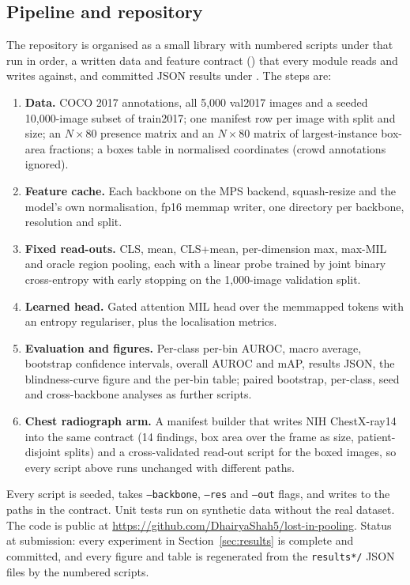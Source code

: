 \documentclass[10pt,letterpaper,twocolumn]{article}
\newcommand{\fname}[1]{\texttt{\detokenize{#1}}}
\begin{document}
\subsection{Pipeline and repository}
The repository is organised as a small library \fname{src/lip/} with numbered scripts under \fname{scripts/} that run in order, a
written data and feature contract (\fname{docs/CONTRACTS.md}) that every module reads and
writes against, and committed JSON results under \fname{results/}. The steps are:
\begin{enumerate}
\item \textbf{Data.} COCO 2017 annotations, all 5,000 val2017 images and a seeded
  10,000-image subset of train2017; one manifest row per image with split and size; an
  $N\times80$ presence matrix and an $N\times80$ matrix of largest-instance box-area fractions;
  a boxes table in normalised coordinates (crowd annotations ignored).
\item \textbf{Feature cache.} Each backbone on the MPS backend, squash-resize and the model's
  own normalisation, fp16 memmap writer, one directory per backbone, resolution and split.
\item \textbf{Fixed read-outs.} CLS, mean, CLS+mean, per-dimension max, max-MIL and oracle
  region pooling, each with a linear probe trained by joint binary cross-entropy with early
  stopping on the 1,000-image validation split.
\item \textbf{Learned head.} Gated attention MIL head over the memmapped tokens with an
  entropy regulariser, plus the localisation metrics.
\item \textbf{Evaluation and figures.} Per-class per-bin AUROC, macro average, bootstrap
  confidence intervals, overall AUROC and mAP, results JSON, the blindness-curve figure and
  the per-bin table; paired bootstrap, per-class, seed and cross-backbone analyses as further
  scripts.
\item \textbf{Chest radiograph arm.} A manifest builder that writes NIH ChestX-ray14 into the
  same contract (14 findings, box area over the frame as size, patient-disjoint splits) and a
  cross-validated read-out script for the boxed images, so every script above runs unchanged
  with different paths.
\end{enumerate}
Every script is seeded, takes \texttt{--backbone}, \texttt{--res} and \texttt{--out} flags, and
writes to the paths in the contract. Unit tests run on synthetic data without the real dataset. The code is public at
\url{https://github.com/DhairyaShah5/lost-in-pooling}.
Status at submission: every experiment in Section~\ref{sec:results} is complete and committed, and every figure and table is regenerated from the \texttt{results*/} JSON files by the numbered scripts.
\end{document}

